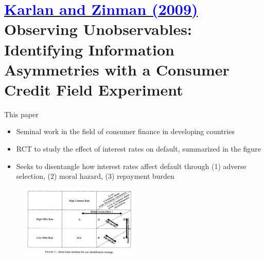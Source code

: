 \documentclass[11pt,notes=hide,aspectratio=169,mathserif]{beamer}
\begin{document}
\section*{\href{https://onlinelibrary.wiley.com/doi/abs/10.3982/ECTA5781}{\textcolor{blue}{Karlan and Zinman (2009)}} \\[5mm] 
\textnormal{\small{Observing Unobservables: Identifying Information Asymmetries with a Consumer Credit Field Experiment}}}

\begin{frame}{This paper}
\begin{itemize}
    \item Seminal work in the field of consumer finance in developing countries
    \item RCT to study the effect of interest rates on default, summarized in the figure
    \item Seeks to disentangle how interest rates affect default through (1) adverse selection, (2) moral hazard, (3) repayment burden
\end{itemize}
\begin{figure}
    \centering
    \includegraphics[width=0.5\textwidth]{inputs/main.png}
\end{figure}
\end{frame}
\end{document}
